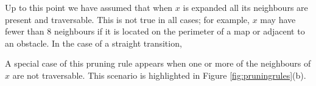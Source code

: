Up to this point we have assumed that when $x$ is expanded all its neighbours
are present and traversable. This is not true in all cases; for example, $x$ may
have fewer than 8 neighbours if it is located on the perimeter of a map or
adjacent to an obstacle.
In the case of a straight transition, 

A special case of this pruning rule appears when one or more of the neighbours
of $x$ are not traversable. This scenario is highlighted in Figure \ref{fig:pruningrules}(b). 
